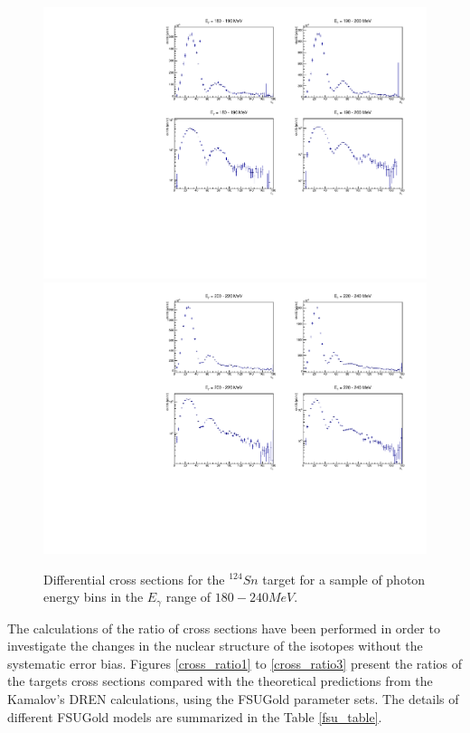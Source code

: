 \begin{figure}[H]
\begin{center}
\includegraphics[scale=0.55]{pictures/pdf/sn124_cross_section_1.pdf}
\includegraphics[scale=0.55]{pictures/pdf/sn124_cross_section_2.pdf}
\caption{Differential cross sections for the $^{124}Sn$ target for a sample of photon energy bins in the $E_{\gamma}$ range of $180 - 240 MeV$.}
\label{cross_section3}
\end{center}
\end{figure}

\indent The calculations of the ratio of cross sections have been performed in order to investigate the changes in the nuclear structure of the isotopes without the systematic error bias. Figures \ref{cross_ratio1} to \ref{cross_ratio3} present the ratios of the targets cross sections compared with the theoretical predictions from the Kamalov's DREN calculations, using the FSUGold parameter sets. The details of different FSUGold models are summarized in the Table \ref{fsu_table}.

